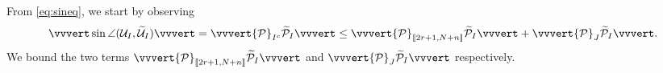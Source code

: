\documentclass[reqno]{amsart}
\theoremstyle{plain}
\theoremstyle{definition}
\begin{document}
From \eqref{eq:sineq}, we start by observing 
\begin{align*}
\vvvert \sin \angle (\mathcal U_{I}, \widetilde{\mathcal U}_{I}) \vvvert =\vvvert {\mathcal P}_{I^c}  \widetilde{\mathcal P}_I \vvvert \le   \vvvert {\mathcal P}_{\llbracket 2r+1, N+n\rrbracket}  \widetilde{\mathcal P}_I \vvvert +  \vvvert {\mathcal P}_J  \widetilde{\mathcal P}_I \vvvert.
\end{align*}
We bound the two terms $ \vvvert {\mathcal P}_{\llbracket 2r+1, N+n\rrbracket}  \widetilde{\mathcal P}_I \vvvert$ and  $\vvvert {\mathcal P}_J  \widetilde{\mathcal P}_I \vvvert$ respectively. 
\end{document}
